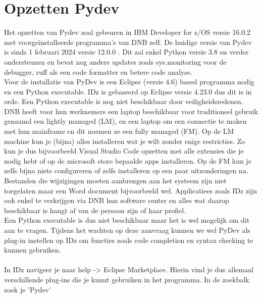 
\chapter{Opzetten Pydev}
\label{ch:opzetten-pydev}
Het opzetten van Pydev zoal gebeuren in IBM Developer for z/OS versie 16.0.2 met voorgeïnstalleerde programma's van DNB zelf. De huidige versie van Pydev is sinds 1 februari 2024 versie 12.0.0 . Dit zal enkel Python versie 3.8 en verder ondersteunen en bevat nog andere updates zoals sys.monitoring voor de debugger, ruff als een code formatter en betere code analyse. \\
Voor de installatie van PyDev is een Eclipse (versie 4.6) based programma nodig en een Python executable. IDz is gebaseerd op Eclipse versie 4.23.0 dus dit is in orde. Een Python executable is nog niet beschikbaar door veiligheidsredenen. DNB heeft voor hun werknemers een laptop beschikbaar voor traditioneel gebruik genaamd een lightly managed (LM), en een laptop om een connectie te maken met hun mainframe en dit noemen ze een fully managed (FM). Op de LM machine kun je (bijna) alles installeren wat je wilt zonder enige restricties. Zo kun je dus bijvoorbeeld Visual Studio Code opzetten met alle extensies die je nodig hebt of op de microsoft store bepaalde apps installeren. Op de FM kun je zelfs bijna niets configureren of zelfs installeren op een paar uitzonderingen na.
Bestanden die wijzigingen moeten aanbrengen aan het systeem zijn niet toegelaten maar een Word document bijvoorbeeld wel. Applicatiees zoals IDz zijn ook enkel te verkrijgen via DNB hun software center en alles wat daarop beschikbaar is hangt af van de persoon zijn of haar profiel. \\ 
Een Python executable is dus niet beschikbaar maar het is wel mogelijk om dit aan te vragen. Tijdens het wachten op deze aanvraag kunnen we wel PyDev als plug-in instellen op IDz om functies zoals code completion en syntax checking te kunnen gebruiken.
\\
\\
In IDz navigeer je naar help -> Eclipse Marketplace. Hierin vind je dus allemaal verschillende plug-ins die je kunut gebruiken in het programma. In de zoekbalk zoek je 'Pydev'